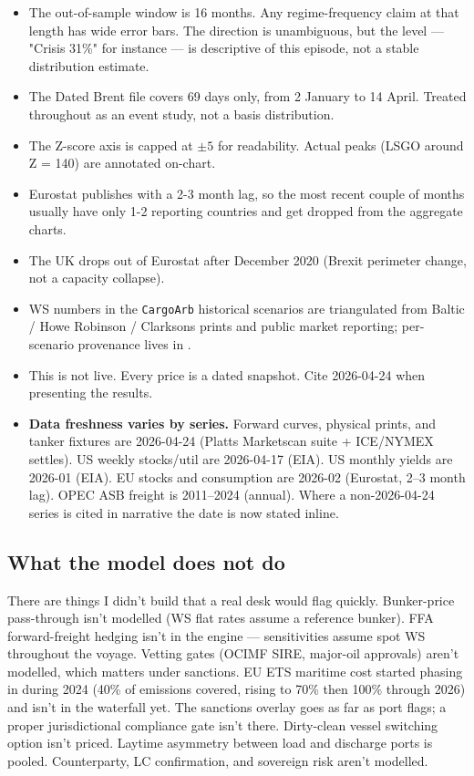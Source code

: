 \documentclass[10pt,a4paper]{article}
\begin{document}
\begin{itemize}[leftmargin=1em,itemsep=0pt]
\item The out-of-sample window is 16 months. Any regime-frequency claim at that length has wide error bars. The direction is unambiguous, but the level --- "Crisis 31\%" for instance --- is descriptive of this episode, not a stable distribution estimate.
\item The Dated Brent file covers 69 days only, from 2 January to 14 April. Treated throughout as an event study, not a basis distribution.
\item The Z-score axis is capped at $\pm 5$ for readability. Actual peaks (LSGO around Z = 140) are annotated on-chart.
\item Eurostat publishes with a 2-3 month lag, so the most recent couple of months usually have only 1-2 reporting countries and get dropped from the aggregate charts.
\item The UK drops out of Eurostat after December 2020 (Brexit perimeter change, not a capacity collapse).
\item WS numbers in the \texttt{CargoArb} historical scenarios are triangulated from Baltic / Howe Robinson / Clarksons prints and public market reporting; per-scenario provenance lives in .
\item This is not live. Every price is a dated snapshot. Cite 2026-04-24 when presenting the results.
\item \textbf{Data freshness varies by series.} Forward curves, physical prints, and tanker fixtures are 2026-04-24 (Platts Marketscan suite + ICE/NYMEX settles). US weekly stocks/util are 2026-04-17 (EIA). US monthly yields are 2026-01 (EIA). EU stocks and consumption are 2026-02 (Eurostat, 2--3 month lag). OPEC ASB freight is 2011--2024 (annual). Where a non-2026-04-24 series is cited in narrative the date is now stated inline.
\end{itemize}

\subsection{What the model does not do}

There are things I didn't build that a real desk would flag quickly. Bunker-price pass-through isn't modelled (WS flat rates assume a reference bunker). FFA forward-freight hedging isn't in the engine --- sensitivities assume spot WS throughout the voyage. Vetting gates (OCIMF SIRE, major-oil approvals) aren't modelled, which matters under sanctions. EU ETS maritime cost started phasing in during 2024 (40\% of emissions covered, rising to 70\% then 100\% through 2026) and isn't in the waterfall yet. The sanctions overlay goes as far as port flags; a proper jurisdictional compliance gate isn't there. Dirty-clean vessel switching option isn't priced. Laytime asymmetry between load and discharge ports is pooled. Counterparty, LC confirmation, and sovereign risk aren't modelled.
\end{document}
